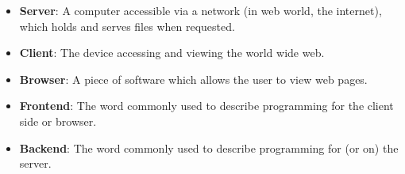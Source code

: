 \begin{itemize}[leftmargin=*]
    \item
        \textbf{Server}:
        A computer accessible via a network (in web world, the internet), which holds and serves files when requested.
    \item
        \textbf{Client}:
        The device accessing and viewing the world wide web.
    \item
        \textbf{Browser}:
        A piece of software which allows the user to view web pages.
    \item
        \textbf{Frontend}:
        The word commonly used to describe programming for the client side or browser.
    \item
        \textbf{Backend}:
        The word commonly used to describe programming for (or on) the server.
\end{itemize}
